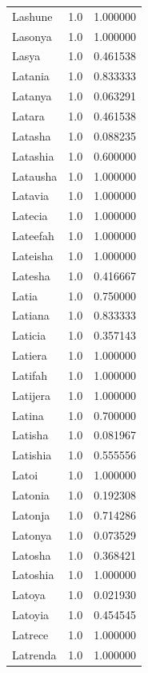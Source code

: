 \documentclass[
  letterpaper,
  DIV=11,
  numbers=noendperiod]{scrreprt}
\begin{document}
\begin{tabular}{lrr}
Lashune         &   1.0 &   1.000000 \\
Lasonya         &   1.0 &   1.000000 \\
Lasya           &   1.0 &   0.461538 \\
Latania         &   1.0 &   0.833333 \\
Latanya         &   1.0 &   0.063291 \\
Latara          &   1.0 &   0.461538 \\
Latasha         &   1.0 &   0.088235 \\
Latashia        &   1.0 &   0.600000 \\
Latausha        &   1.0 &   1.000000 \\
Latavia         &   1.0 &   1.000000 \\
Latecia         &   1.0 &   1.000000 \\
Lateefah        &   1.0 &   1.000000 \\
Lateisha        &   1.0 &   1.000000 \\
Latesha         &   1.0 &   0.416667 \\
Latia           &   1.0 &   0.750000 \\
Latiana         &   1.0 &   0.833333 \\
Laticia         &   1.0 &   0.357143 \\
Latiera         &   1.0 &   1.000000 \\
Latifah         &   1.0 &   1.000000 \\
Latijera        &   1.0 &   1.000000 \\
Latina          &   1.0 &   0.700000 \\
Latisha         &   1.0 &   0.081967 \\
Latishia        &   1.0 &   0.555556 \\
Latoi           &   1.0 &   1.000000 \\
Latonia         &   1.0 &   0.192308 \\
Latonja         &   1.0 &   0.714286 \\
Latonya         &   1.0 &   0.073529 \\
Latosha         &   1.0 &   0.368421 \\
Latoshia        &   1.0 &   1.000000 \\
Latoya          &   1.0 &   0.021930 \\
Latoyia         &   1.0 &   0.454545 \\
Latrece         &   1.0 &   1.000000 \\
Latrenda        &   1.0 &   1.000000 \\

\end{tabular}
\end{document}

